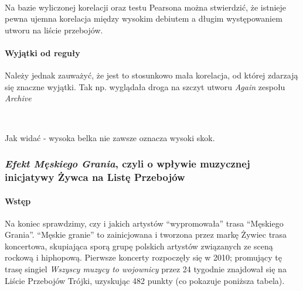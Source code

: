 \documentclass[11pt]{article}
\begin{document}
    
    \begin{center}
    \end{center}
    { \hspace*{\fill} \\}
    
    Na bazie wyliczonej korelacji oraz testu Pearsona można stwierdzić, że
istnieje pewna ujemna korelacja między wysokim debiutem a długim
występowaniem utworu na liście przebojów.

\hypertarget{wyjux105tki-od-reguux142y}{%
\paragraph{Wyjątki od reguły}\label{wyjux105tki-od-reguux142y}}

Należy jednak zauważyć, że jest to stosunkowo mała korelacja, od której
zdarzają się znaczne wyjątki. Tak np. wyglądała droga na szczyt utworu
\emph{Again} zespołu \emph{Archive}

    \begin{center}
    \end{center}
    { \hspace*{\fill} \\}
    
    Jak widać - wysoka belka nie zawsze oznacza wysoki skok.

    \hypertarget{efekt-mux119skiego-grania-czyli-o-wpux142ywie-muzycznej-inicjatywy-ux17cywca-na-listux119-przebojuxf3w}{%
\subsubsection{\texorpdfstring{\emph{Efekt Męskiego Grania}, czyli o
wpływie muzycznej inicjatywy Żywca na Listę
Przebojów}{Efekt Męskiego Grania, czyli o wpływie muzycznej inicjatywy Żywca na Listę Przebojów}}\label{efekt-mux119skiego-grania-czyli-o-wpux142ywie-muzycznej-inicjatywy-ux17cywca-na-listux119-przebojuxf3w}}

\hypertarget{wstux119p}{%
\paragraph{Wstęp}\label{wstux119p}}

Na koniec sprawdzimy, czy i jakich artystów ``wypromowała'' trasa
``Męskiego Grania''. ``Męskie granie'' to zainicjowana i tworzona przez
markę Żywiec trasa koncertowa, skupiająca sporą grupę polskich artystów
związanych ze sceną rockową i hiphopową. Pierwsze koncerty rozpoczęły
się w 2010; promujący tę trasę singiel \emph{Wszyscy muzycy to
wojownicy} przez 24 tygodnie znajdował się na Liście Przebojów Trójki,
uzyskując 482 punkty (co pokazuje poniższa tabela).
\end{document}

